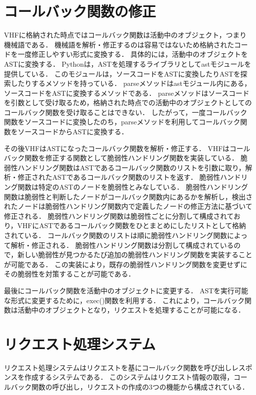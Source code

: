 \documentclass[a4paper,12pt]{jreport}
\begin{document}
\section{コールバック関数の修正}
VHFに格納された時点ではコールバック関数は活動中のオブジェクト，つまり機械語である．
機械語を解析・修正するのは容易ではないため格納されたコードを一度修正しやすい形式に変換する．
具体的には，活動中のオブジェクトをASTに変換する．
Pythonは，ASTを処理するライブラリとしてastモジュールを提供している．
このモジュールは，ソースコードをASTに変換したりASTを探索したりするメソッドを持っている．
parseメソッドはastモジュール内にある，ソースコードをASTに変換するメソッドである．
parseメソッドはソースコードを引数として受け取るため，格納された時点での活動中のオブジェクトとしてのコールバック関数を受け取ることはできない．
したがって，一度コールバック関数をソースコードに変換したのち，parseメソッドを利用してコールバック関数をソースコードからASTに変換する．

その後VHFはASTになったコールバック関数を解析・修正する．
VHFはコールバック関数を修正する関数として脆弱性ハンドリング関数を実装している．
脆弱性ハンドリング関数はASTであるコールバック関数のリストを引数に取り，解析・修正されたASTであるコールバック関数のリストを返す．
脆弱性ハンドリング関数は特定のASTのノードを脆弱性とみなしている．
脆弱性ハンドリング関数は脆弱性と判断したノードがコールバック関数内にあるかを解析し，検出されたノードは脆弱性ハンドリング関数内で定義したノードの修正方法に基づいて修正される．
脆弱性ハンドリング関数は脆弱性ごとに分割して構成されており，VHFにASTであるコールバック関数をひとまとめにしたリストとして格納されている．
コールバック関数のリストは順に脆弱性ハンドリング関数によって解析・修正される．
脆弱性ハンドリング関数は分割して構成されているので，新しい脆弱性が見つかるたび追加の脆弱性ハンドリング関数を実装することが可能である．
この実装により，既存の脆弱性ハンドリング関数を変更せずにその脆弱性を対策することが可能である．

最後にコールバック関数を活動中のオブジェクトに変更する．
ASTを実行可能な形式に変更するために，exec()関数を利用する．
これにより，コールバック関数は活動中のオブジェクトとなり，リクエストを処理することが可能になる．

\section{リクエスト処理システム}
リクエスト処理システムはリクエストを基にコールバック関数を呼び出しレスポンスを作成するシステムである．
このシステムはリクエスト情報の取得，コールバック関数の呼び出し，リクエストの作成の3つの機能から構成されている．
\end{document}
